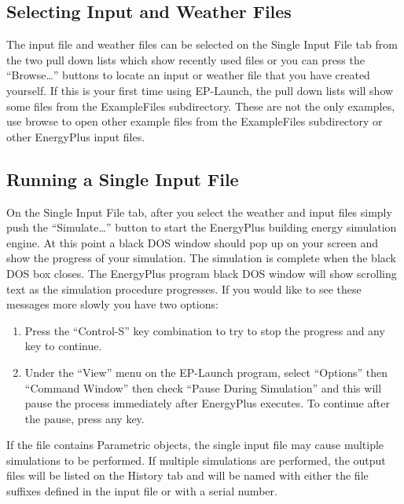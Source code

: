 \subsection{Selecting Input and Weather Files}\label{selecting-input-and-weather-files}

The input file and weather files can be selected on the Single Input File tab from the two pull down lists which show recently used files or you can press the ``Browse\ldots{}'' buttons to locate an input or weather file that you have created yourself. If this is your first time using EP-Launch, the pull down lists will show some files from the ExampleFiles subdirectory. These are not the only examples, use browse to open other example files from the ExampleFiles subdirectory or other EnergyPlus input files.

\subsection{Running a Single Input File}\label{running-a-single-input-file}

On the Single Input File tab, after you select the weather and input files simply push the ``Simulate\ldots{}'' button to start the EnergyPlus building energy simulation engine. At this point a black DOS window should pop up on your screen and show the progress of your simulation. The simulation is complete when the black DOS box closes. The EnergyPlus program black DOS window will show scrolling text as the simulation procedure progresses. If you would like to see these messages more slowly you have two options:

\begin{enumerate}
\def\labelenumi{\arabic{enumi})}
\item
  Press the ``Control-S'' key combination to try to stop the progress and any key to continue.
\item
  Under the ``View'' menu on the EP-Launch program, select ``Options'' then ``Command Window'' then check ``Pause During Simulation'' and this will pause the process immediately after EnergyPlus executes. To continue after the pause, press any key.
\end{enumerate}

If the file contains Parametric objects, the single input file may cause multiple simulations to be performed. If multiple simulations are performed, the output files will be listed on the History tab and will be named with either the file suffixes defined in the input file or with a serial number.

